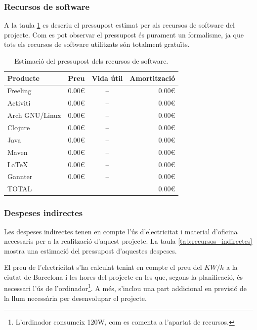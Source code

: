 \documentclass[10pt,a4paper]{article}
\begin{document}
\subsubsection{Recursos de software}

A la taula \ref{tab:recursos_software} es descriu el pressupost estimat per als recursos de software del projecte. Com es pot observar el pressupost és purament un formalisme, ja que tots els recursos de software utilitzats són totalment gratuïts.

\begin{table}[!htb]
    \centering
    \begin{tabular}{|l||c|c|r|}
        \hline
         Producte & Preu & Vida útil & Amortització \\
         \hline\hline
         Freeling & 0.00€ & -- & 0.00€ \\
         Activiti & 0.00€ & -- & 0.00€ \\
         Arch GNU/Linux & 0.00€ & -- & 0.00€ \\
         Clojure & 0.00€ & -- & 0.00€ \\
         Java & 0.00€ & -- & 0.00€ \\
         Maven & 0.00€ & -- & 0.00€ \\
         \LaTeX & 0.00€ & -- & 0.00€ \\
         Gannter & 0.00€ & -- & 0.00€ \\
         \hline\hline
         TOTAL & & & 0.00€ \\
         \hline
    \end{tabular}
    \caption{Estimació del pressupost dels recursos de software.}
    \label{tab:recursos_software}
\end{table}


\subsubsection{Despeses indirectes}

Les despeses indirectes tenen en compte l'ús d'electricitat i material d'oficina necessaris per a la realització d'aquest projecte. La taula \ref{tab:recursos_indirectes} mostra una estimació del pressupost d'aquestes despeses.

El preu de l'electricitat s'ha calculat tenint en compte el preu del $KW/h$ a la ciutat de Barcelona i les hores del projecte en les que, segons la planificació, és necessari l'ús de l'ordinador\footnote{L'ordinador consumeix 120W, com es comenta a l'apartat de recursos.}. A més, s'inclou una part addicional en previsió de la llum necessària per desenvolupar el projecte.
\end{document}
